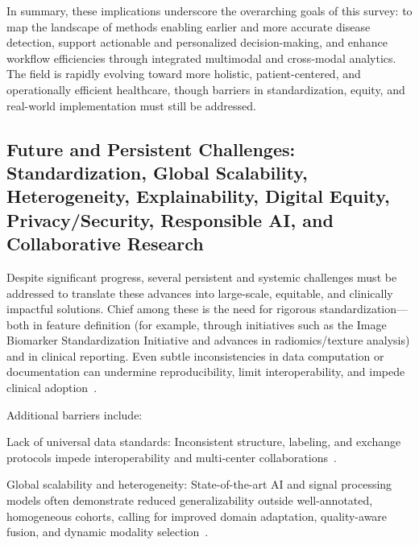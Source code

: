 \documentclass[sigconf]{acmart}
\begin{document}
In summary, these implications underscore the overarching goals of this survey: to map the landscape of methods enabling earlier and more accurate disease detection, support actionable and personalized decision-making, and enhance workflow efficiencies through integrated multimodal and cross-modal analytics. The field is rapidly evolving toward more holistic, patient-centered, and operationally efficient healthcare, though barriers in standardization, equity, and real-world implementation must still be addressed.

\subsection{Future and Persistent Challenges: Standardization, Global Scalability, Heterogeneity, Explainability, Digital Equity, Privacy/Security, Responsible AI, and Collaborative Research}

Despite significant progress, several persistent and systemic challenges must be addressed to translate these advances into large-scale, equitable, and clinically impactful solutions. Chief among these is the need for rigorous standardization—both in feature definition (for example, through initiatives such as the Image Biomarker Standardization Initiative and advances in radiomics/texture analysis) and in clinical reporting. Even subtle inconsistencies in data computation or documentation can undermine reproducibility, limit interoperability, and impede clinical adoption~\cite{ref5,ref13,ref16,ref17,ref18,ref19,ref20,ref21,ref22,ref23,ref24,ref25,ref28,ref30,ref31,ref32,ref33,ref34,ref35,ref36,ref37,ref38,ref39,ref40,ref41,ref42,ref43,ref44,ref45,ref46,ref47,ref48,ref49,ref50,ref51,ref52,ref53,ref54,ref55,ref56,ref57,ref58,ref59,ref60,ref61,ref62,ref63,ref64,ref65,ref66,ref67,ref68,ref69,ref70,ref71,ref72,ref73,ref74,ref75,ref76,ref77,ref78,ref79,ref80,ref81,ref82,ref83,ref84,ref85,ref86,ref87,ref88,ref89,ref90,ref91,ref92,ref94,ref95,ref96,ref97,ref98,ref99,ref100,ref101,ref102,ref103,ref104,ref105,ref106,ref107}.

Additional barriers include:

Lack of universal data standards: Inconsistent structure, labeling, and exchange protocols impede interoperability and multi-center collaborations~\cite{ref88,ref89,ref92}.

Global scalability and heterogeneity: State-of-the-art AI and signal processing models often demonstrate reduced generalizability outside well-annotated, homogeneous cohorts, calling for improved domain adaptation, quality-aware fusion, and dynamic modality selection~\cite{ref39,ref47,ref94,ref96}. 
\end{document}
